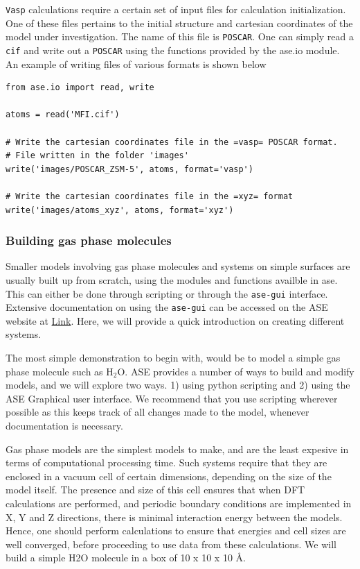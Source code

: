 \documentclass[11pt]{article}
\begin{document}
\texttt{Vasp} calculations require a certain set of input files for calculation initialization. One of these files pertains to the initial structure and cartesian coordinates of the model under investigation. The name of this file is \texttt{POSCAR}. One can simply read a \texttt{cif} and write out a \texttt{POSCAR} using the functions provided by the ase.io module. An example of writing files of various formats is shown below

\begin{verbatim}
from ase.io import read, write

atoms = read('MFI.cif')

# Write the cartesian coordinates file in the =vasp= POSCAR format.
# File written in the folder 'images'
write('images/POSCAR_ZSM-5', atoms, format='vasp')

# Write the cartesian coordinates file in the =xyz= format
write('images/atoms_xyz', atoms, format='xyz')
\end{verbatim}

\subsubsection{Building gas phase molecules}
\label{sec:org6c47c5b}
Smaller models involving gas phase molecules and systems on simple surfaces are usually built up from scratch, using the modules and functions availble in ase. This can either be done through scripting or through the \texttt{ase-gui} interface. Extensive documentation on using the \texttt{ase-gui} can be accessed on the ASE website at \href{https://wiki.fysik.dtu.dk/ase/ase/gui/gui.html}{Link}. Here, we will provide a quick introduction on creating different systems.

The most simple demonstration to begin with, would be to model a simple gas phase molecule such as H\(_{\text{2}}\)O. ASE provides a number of ways to build and modify models, and we will explore two ways. 1) using python scripting and 2) using the ASE Graphical user interface. We recommend that you use scripting wherever possible as this keeps track of all changes made to the model, whenever documentation is necessary. 

Gas phase models are the simplest models to make, and are the least expesive in terms of computational processing time. Such systems require that they are enclosed in a vacuum cell of certain dimensions, depending on the size of the model itself. The presence and size of this cell ensures that when DFT calculations are performed, and periodic boundary conditions are implemented in X, Y and Z directions, there is minimal interaction energy between the models. Hence, one should perform calculations to ensure that energies and cell sizes are well converged, before proceeding to use data from these calculations.
We will build a simple H2O molecule in a box of 10 x 10 x 10 \AA{}. 
\end{document}
